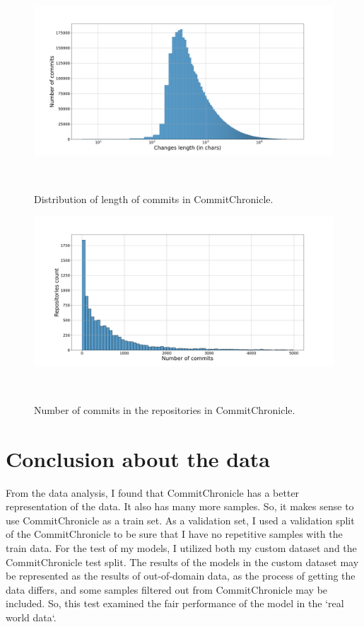 \begin{figure}[H]
    \includegraphics[scale=0.30]{figs/changes_len_dist_comchron.png}
    \caption{Distribution of length of commits in CommitChronicle.}~\label{fig:changes_len_dist_CommitChronicle}
\end{figure}

\begin{figure}[H]
    \includegraphics[scale=0.30]{figs/Commits distribution_comchron.png}
    \caption{Number of commits in the repositories in CommitChronicle.}~\label{fig:commits_distribution_CommitChronicle}
\end{figure}

\section{Conclusion about the data}\label{sec:conclusion_data}
From the data analysis, I found that CommitChronicle has a better representation of the data. It also has many more samples. So, it makes sense to use CommitChronicle as a train set. As a validation set, I used a validation split of the CommitChronicle to be sure that I have no repetitive samples with the train data. For the test of my models, I utilized both my custom dataset and the CommitChronicle test split. The results of the models in the custom dataset may be represented as the results of out-of-domain data, as the process of getting the data differs, and some samples filtered out from CommitChronicle may be included.  So, this test examined the fair performance of the model in the `real world data`.

